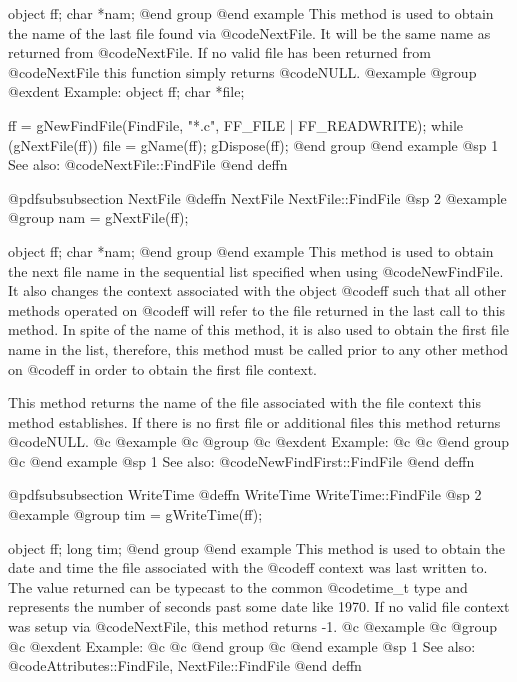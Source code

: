 object  ff;
char    *nam;
@end group
@end example
This method is used to obtain the name of the last file found via
@code{NextFile}.  It will be the same name as returned from
@code{NextFile}.  If no valid file has been returned from
@code{NextFile} this function simply returns @code{NULL}.
@example
@group
@exdent Example:
object  ff;
char   *file;

ff = gNewFindFile(FindFile, "*.c", FF_FILE | FF_READWRITE);
while (gNextFile(ff))  {
        file = gName(ff);
}
gDispose(ff);
@end group
@end example
@sp 1
See also:  @code{NextFile::FindFile}
@end deffn











@pdfsubsubsection {NextFile}
@deffn {NextFile} NextFile::FindFile
@sp 2
@example
@group
nam = gNextFile(ff);

object  ff;
char   *nam;
@end group
@end example
This method is used to obtain the next file name in the sequential list
specified when using @code{NewFindFile}.  It also changes the context
associated with the object @code{ff} such that all other methods
operated on @code{ff} will refer to the file returned in the last call
to this method.  In spite of the name of this method, it is also used
to obtain the first file name in the list, therefore, this method must
be called prior to any other method on @code{ff} in order to obtain
the first file context.

This method returns the name of the file associated with the file
context this method establishes.  If there is no first file or
additional files this method returns @code{NULL}.
@c @example
@c @group
@c @exdent Example:
@c 
@c @end group
@c @end example
@sp 1
See also:  @code{NewFindFirst::FindFile}
@end deffn











@pdfsubsubsection {WriteTime}
@deffn {WriteTime} WriteTime::FindFile
@sp 2
@example
@group
tim = gWriteTime(ff);

object  ff;
long    tim;
@end group
@end example
This method is used to obtain the date and time the file associated
with the @code{ff} context was last written to.  The value returned
can be typecast to the common @code{time_t} type and represents the
number of seconds past some date like 1970.  If no valid file
context was setup via @code{NextFile}, this method returns -1.
@c @example
@c @group
@c @exdent Example:
@c 
@c @end group
@c @end example
@sp 1
See also:  @code{Attributes::FindFile, NextFile::FindFile}
@end deffn







